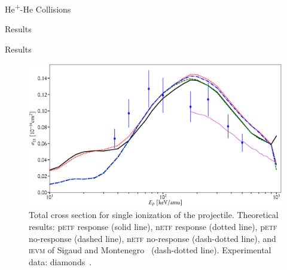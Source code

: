 \documentclass[letterpaper, 11 pt]{report}
\begin{document}
\begin{chapter}{\texorpdfstring{He\textsuperscript{+}}{He+}-He Collisions \label{chap:hephe}}
\begin{section}{Results \label{sec:hephe-disc}}
\begin{subsection}{Results \label{sec:hephe-res}}
         \begin{figure}[t]
            \centering
            \includegraphics[width = \linewidth]{./images/hephe-cross/HepHe-201.eps}
            \caption[Total cross section for single ionization of the projectile in
                     He\textsuperscript{+}-He collisions.]
                    {Total cross section for single ionization of the projectile.
                     Theoretical results: p\textsc{etf} response (solid line), n\textsc{etf} response
                                          (dotted line), p\textsc{etf} no-response (dashed line),
                                          n\textsc{etf} no-response (dash-dotted line), and
                                          \textsc{ievm} of Sigaud and Montenegro~\cite{SM-03}
                                          (dash-dotted line).
                     Experimental data: diamonds~\cite{Dub-89}. \label{fig:cs201}}
         \end{figure}


\end{subsection}
\end{section}
\end{chapter}
\end{document}
